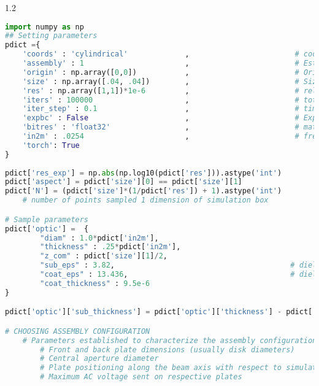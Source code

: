 \begin{spacing}{1.2}
\begin{lstlisting}[frame=single, language=Python]
import numpy as np
## Setting parameters
pdict ={
    'coords' : 'cylindrical'             ,                        # coordinate system chosen for simulation box
    'assembly' : 1                       ,                        # Establish plate geometry / location and voltage based on assembly 
    'origin' : np.array([0,0])           ,                        # Origin of the simulation space / map
    'size' : np.array([.04, .04])        ,                        # Size of simulation box [m] 
    'res' : np.array([1,1])*1e-6         ,                        # relative resolution [coord1, coord2]
    'iters' : 100000                     ,                        # total number of time iterations
    'iter_step' : 0.1                    ,                        # time step
    'expbc' : False                      ,                        # Exponential boundary conditions?
    'bitres' : 'float32'                 ,                        # matrix element data type ('float32' vs 'float64')
    'in2m' : .0254                       ,                        # frequently used conversion
    'torch': True
}
    
pdict['res_exp'] = np.abs(np.log10(pdict['res'])).astype('int')
pdict['aspect'] = pdict['size'][0] == pdict['size'][1]
pdict['N'] = (pdict['size']*(1/pdict['res']) + 1).astype('int')   
    # number of points sampled 1 dimension of simulation box

# Sample parameters
pdict['optic'] =  {
        "diam" : 1.0*pdict['in2m'],
        "thickness" : .25*pdict['in2m'], 
        "z_com" : pdict['size'][1]/2,
        "sub_eps" : 3.82,                                        # dielectric constant for substrate (fused silica)
        "coat_eps" : 13.436,                                     # dielectric constant for coating material (AlGaAs / GaAs)
        "coat_thickness" : 9.5e-6     
}

pdict['optic']['sub_thickness'] = pdict['optic']['thickness'] - pdict['optic']['coat_thickness']

# CHOOSING ASSEMBLY CONFIGURATION
    # Parameters established to characterize the assembly configurations:
        # Front and back plate dimensions (usually disk diameters)
        # Central aperture diameter
        # Plate positioning along the beam axis with respect to simulation size center
        # Maximum AC voltage sent on respective plates


\end{lstlisting}
\end{spacing}
